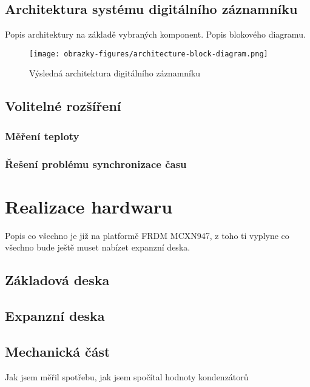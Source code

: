 
\section{Architektura systému digitálního záznamníku}
Popis architektury na základě vybraných komponent. Popis blokového diagramu.

\begin{figure}[h]
    \centering
    \texttt{[image: obrazky-figures/architecture-block-diagram.png]}
    
    \caption{Výsledná architektura digitálního záznamníku}
    \label{fig:low-power-modes}
\end{figure}


\section{Volitelné rozšíření}
\subsection{Měření teploty}


\subsection{Řešení problému synchronizace času}


\chapter{Realizace hardwaru}
Popis co všechno je již na platformě FRDM MCXN947, z toho ti vyplyne co všechno bude ještě muset nabízet expanzní deska.
\section{Základová deska}
\section{Expanzní deska}

\section{Mechanická část}
Jak jsem měřil spotřebu, jak jsem spočítal hodnoty kondenzátorů

